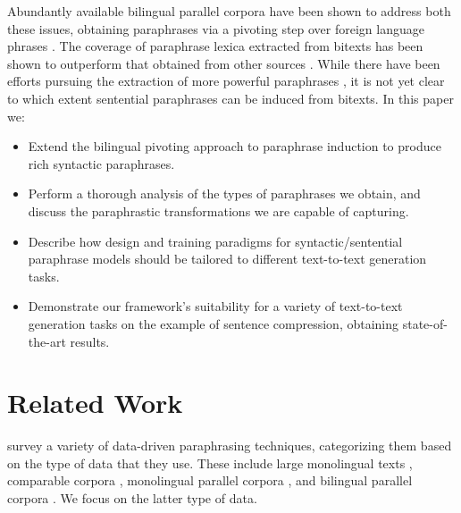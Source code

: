 \documentclass[11pt]{article}
\begin{document}
Abundantly available bilingual parallel corpora have been shown to
address both these issues, obtaining paraphrases via a pivoting step
over foreign language phrases \cite{Callison-Burch2005}. The coverage
of paraphrase lexica extracted from bitexts has been shown to
outperform that obtained from other sources \cite{Zhao2008b}. While
there have been efforts pursuing the extraction of more powerful
paraphrases
\cite{Madnani2007,Callison-Burch2008,cohn-lapata:2008,Zhao2008}, it is
not yet clear to which extent sentential paraphrases can be induced
from bitexts. In this paper we:
\begin{itemize}
\item Extend the bilingual pivoting approach to paraphrase induction
  to produce rich syntactic paraphrases.
\item Perform a thorough analysis of the types of paraphrases we
  obtain, and discuss the paraphrastic transformations we are capable
  of capturing.
\item Describe how design and training paradigms for
  syntactic/sentential paraphrase models should be tailored to
  different text-to-text generation tasks.
\item Demonstrate our framework's suitability for a variety of
  text-to-text generation tasks on the example of sentence
  compression, obtaining state-of-the-art results.
\end{itemize}


\section{Related Work} \label{related_work}

 survey a variety of data-driven paraphrasing
techniques, categorizing them based on the type of data that they use.
These include large monolingual texts
\cite{Lin2001,szpektor-EtAl:2004:EMNLP,Bhagat2008}, comparable corpora
\cite{Barzilay2003,Dolan2004}, monolingual parallel corpora
\cite{Barzilay2001,Pang2003}, and bilingual parallel corpora
\cite{Callison-Burch2005,Madnani2007,Zhao2008}.  We focus on the
latter type of data.
\end{document}

